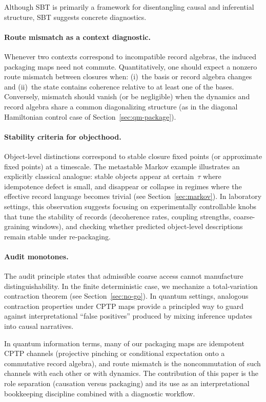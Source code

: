 Although SBT is primarily a framework for disentangling causal and inferential structure, SBT suggests concrete diagnostics.

\paragraph{Route mismatch as a context diagnostic.}
Whenever two contexts correspond to incompatible record algebras, the induced packaging maps need not commute.
Quantitatively, one should expect a nonzero route mismatch between closures when:
(i)~the basis or record algebra changes and
(ii)~the state contains coherence relative to at least one of the bases.
Conversely, mismatch should vanish (or be negligible) when the dynamics and record algebra share a common diagonalizing structure (as in the diagonal Hamiltonian control case of Section~\ref{sec:qm-package}).

\paragraph{Stability criteria for objecthood.}
Object-level distinctions correspond to stable closure fixed points (or approximate fixed points) at a timescale.
The metastable Markov example illustrates an explicitly classical analogue: stable objects appear at certain~$\tau$ where idempotence defect is small, and disappear or collapse in regimes where the effective record language becomes trivial (see Section~\ref{sec:markov}).
In laboratory settings, this observation suggests focusing on experimentally controllable knobs that tune the stability of records (decoherence rates, coupling strengths, coarse-graining windows), and checking whether predicted object-level descriptions remain stable under re-packaging.

\paragraph{Audit monotones.}
The audit principle states that admissible coarse access cannot manufacture distinguishability.
In the finite deterministic case, we mechanize a total-variation contraction theorem (see Section~\ref{sec:no-go}).
In quantum settings, analogous contraction properties under CPTP maps provide a principled way to guard against interpretational ``false positives'' produced by mixing inference updates into causal narratives.

In quantum information terms, many of our packaging maps are idempotent CPTP channels (projective pinching or conditional expectation onto a commutative record algebra), and route mismatch is the noncommutation of such channels with each other or with dynamics. The contribution of this paper is the role separation (causation versus packaging) and its use as an interpretational bookkeeping discipline combined with a diagnostic workflow.

